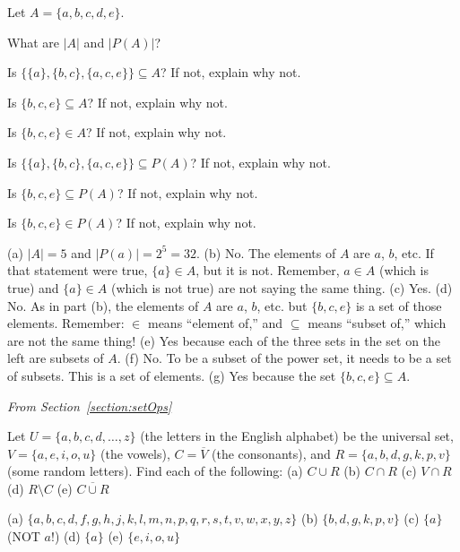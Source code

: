 \begin{requ}
Let $A=\{a,b,c,d,e\}$. 
\begin{lenum}
\item
What are $|A|$ and $|P(A)|$?
\item
Is $\{\{a\},\{b,c\},\{a,c,e\}\}\subseteq A$? If not, explain why not.
\item
Is $\{b,c,e\}\subseteq A$? If not, explain why not.
\item
Is $\{b,c,e\}\in A$? If not, explain why not.
\item
Is $\{\{a\},\{b,c\},\{a,c,e\}\}\subseteq P(A)$? If not, explain why not.
\item
Is $\{b,c,e\}\subseteq P(A)$? If not, explain why not.
\item
Is $\{b,c,e\}\in P(A)$? If not, explain why not.
\end{lenum}
\begin{requanswer}
(a) $|A|=5$ and $|P(a)|=2^5=32$.
(b) No. The elements of $A$ are $a$, $b$, etc. 
If that statement were true, $\{a\}\in A$, but it is not. Remember, $a\in A$ (which is true) and 
$\{a\}\in A$ (which is not true) are not saying the same thing.
(c) Yes.
(d) No. As in part (b), the elements of $A$ are $a$, $b$, etc. but $\{b,c,e\}$ is a set of those elements.
Remember: $\in$ means ``element of,'' and $\subseteq$ means ``subset of,'' which are not the same thing!
(e) Yes because each of the three sets in the set on the left are subsets of $A$.
(f) No. To be a subset of the power set, it needs to be a set of subsets. This is a set of elements.
(g) Yes because the set $\{b,c,e\}\subseteq A$.
\end{requanswer}
\end{requ}

\medskip
\noindent
{\em From Section~\ref{section:setOps}}

\begin{requ}
Let $U=\{a,b,c,d,\ldots, z\}$ (the letters in the English alphabet) be the universal set,
$V=\{a,e,i,o,u\}$ (the vowels), 
$C=\overline{V}$ (the consonants), 
and $R=\{a,b,d,g,k,p,v\}$ (some random letters).
Find each of the following: 
(a) $C\cup R$
(b) $C\cap R$
(c) $V\cap R$
(d) $R\setminus C$
(e) $\overline{C\cup R}$
\begin{requanswer}
(a) $\{a, b, c, d, f, g, h, j, k, l, m, n, p, q, r, s, t, v, w, x, y, z\}$
(b) $\{b, d, g, k, p, v\}$
(c) $\{a\}$ (NOT $a$!)
(d) $\{a\}$
(e) $\{e, i, o, u \}$
\end{requanswer}
\end{requ}


